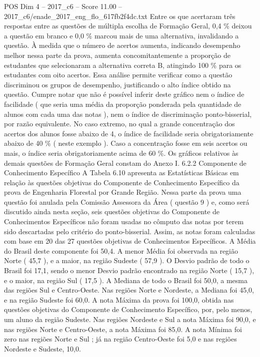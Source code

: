 \begin{textsample}{POS Dim 4 – 2017\_c6 – Score 11.00 – 2017\_c6/enade\_2017\_eng\_flo\_617fb2f4dc.txt}
Entre os que acertaram três respostas entre as questões de múltipla escolha de Formação Geral, 0,4 \% deixou a questão em branco e 0,0 \% marcou mais de uma alternativa, invalidando a questão.
À medida que o número de acertos aumenta, indicando desempenho melhor nessa parte da prova, aumenta concomitantemente a proporção de estudantes que selecionaram a alternativa correta B, atingindo 100 \% para os estudantes com oito acertos.
Essa análise permite verificar como a questão discriminou os grupos de desempenho, justificando o alto índice obtido na questão.
Cumpre notar que não é possível inferir deste gráfico nem o índice de facilidade ( que seria uma média da proporção ponderada pela quantidade de alunos com cada uma das notas ), nem o índice de discriminação ponto-bisserial, por razão equivalente.
No caso extremo, no qual a grande concentração dos acertos dos alunos fosse abaixo de 4, o índice de facilidade seria obrigatoriamente abaixo de 40 \% ( neste exemplo ).
Caso a concentração fosse em seis acertos ou mais, o índice seria obrigatoriamente acima de 60 \%.
Os gráficos relativos às demais questões de Formação Geral constam do Anexo I. 6.2.2 Componente de Conhecimento Específico A Tabela 6.10 apresenta as Estatísticas Básicas em relação às questões objetivas do Componente de Conhecimento Específico da prova de Engenharia Florestal por Grande Região.
Nessa parte da prova uma questão foi anulada pela Comissão Assessora da Área ( questão 9 ) e, como será discutido ainda nesta seção, seis questões objetivas do Componente de Conhecimentos Específicos não foram usadas no cômputo das notas por terem sido descartadas pelo critério do ponto-bisserial.
Assim, as notas foram calculadas com base em 20 das 27 questões objetivas de Conhecimentos Específicos.
A Média do Brasil deste componente foi 50,4.
A menor Média foi observada na região Norte ( 45,7 ), e a maior, na região Sudeste ( 57,9 ).
O Desvio padrão de todo o Brasil foi 17,1, sendo o menor Desvio padrão encontrado na região Norte ( 15,7 ), e o maior, na região Sul ( 17,5 ).
A Mediana de todo o Brasil foi 50,0, a mesma das regiões Sul e Centro-Oeste.
Nas regiões Norte e Nordeste, a Mediana foi 45,0, e na região Sudeste foi 60,0.
A nota Máxima da prova foi 100,0, obtida nas questões objetivas do Componente de Conhecimento Específico, por, pelo menos, um aluno da região Sudeste.
Nas regiões Nordeste e Sul a nota Máxima foi 90,0, e nas regiões Norte e Centro-Oeste, a nota Máxima foi 85,0.
A nota Mínima foi zero nas regiões Norte e Sul ; já na região Centro-Oeste foi 5,0 e nas regiões Nordeste e Sudeste, 10,0.

\end{textsample}
